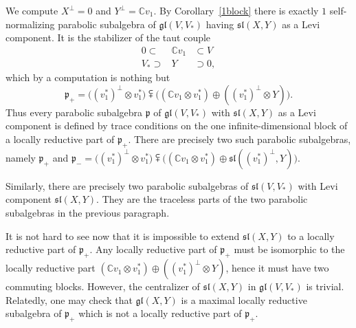 \documentclass{amsart}
\theoremstyle{definition}
\theoremstyle{remark}
\numberwithin{equation}{section}
\newcommand {\C} {\mathbb{C}}
\def\gl{\mathfrak {gl}}
\def\p{\mathfrak {p}}
\def\sl{\mathfrak{sl}}
\begin{document}
We compute $X^\perp = 0$ and $Y^\perp = \C v_1$.  By Corollary~\ref{1block} there is exactly $1$ self-normalizing parabolic subalgebra of $\gl(V,V_*)$ having $\sl(X,Y)$ as a Levi component.  It is the stabilizer of the taut couple
\begin{eqnarray*}
0 \subset & \C v_1 & \subset V\\
V_* \supset & Y & \supset 0, 
\end{eqnarray*}
which by a computation is nothing but $$\p_+ = \big( (v_1^*)^\perp \otimes v_1^* \big) \subsetplus \big( ( \C v_1 \otimes v_1^*) \oplus ((v_1^*)^\perp \otimes Y) \big).$$  Thus every parabolic subalgebra $\p$ of $\gl(V,V_*)$ with $\sl(X,Y)$ as a Levi component is defined by trace conditions on the one infinite-dimensional block of a locally reductive part of $\p_+$.  There are precisely two such parabolic subalgebras, namely $\p_+$ and $\p_- = \big( (v_1^*)^\perp \otimes v_1^* \big) \subsetplus \big( ( \C v_1 \otimes v_1^*) \oplus  \sl((v_1^*)^\perp, Y) \big)$.

Similarly, there are precisely two parabolic subalgebras of $\sl(V,V_*)$ with Levi component $\sl(X,Y)$.  They are the traceless parts of the two parabolic subalgebras in the previous paragraph.

It is not hard to see now that it is impossible to extend $\sl(X,Y)$ to a locally reductive part of $\p_+$.  Any locally reductive part of $\p_+$ must be isomorphic to the locally reductive part $(\C v_1 \otimes v_1^*) \oplus ((v_1^*)^\perp \otimes Y)$, hence it must have two commuting blocks.  However, the centralizer of $\sl(X,Y)$ in $\gl(V,V_*)$ is trivial.  Relatedly, one may check that $\gl(X,Y)$ is a maximal locally reductive subalgebra of $\p_+$ which is not a locally reductive part of $\p_+$.
\end{document}
